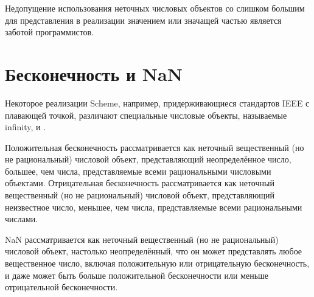Недопущение использования неточных числовых объектов со слишком большим для представления в
реализации значением или значащей частью является заботой программистов.\vspace{-5mm}

\section{Бесконечность и NaN}\vspace{-2mm}

Некоторое реализации Scheme, например, придерживающиеся стандартов IEEE с плавающей
точкой, различают специальные числовые объекты, называемые \mainindex
{infinity},  и
.

Положительная бесконечность рассматривается как неточный вещественный (но не рациональный)
числовой объект, представляющий неопределённое число, большее, чем числа, представляемые всеми
рациональными числовыми объектами. Отрицательная бесконечность рассматривается как неточный
вещественный (но не рациональный) числовой объект, представляющий неизвестное число, меньшее,
чем числа, представляемые всеми рациональными числами.

NaN рассматривается как неточный вещественный (но не рациональный) числовой объект, настолько
неопределённый, что он может представлять любое вещественное число, включая положительную или
отрицательную бесконечность, и даже может быть больше положительной бесконечности или
меньше отрицательной бесконечности.\vspace{-5mm}

